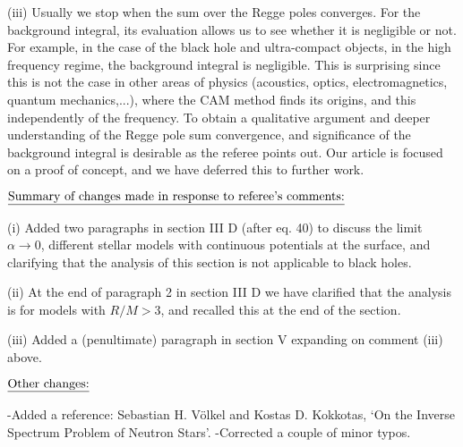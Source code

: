 


\bigskip
\bigskip
(iii)  Usually we stop when the sum over the Regge poles converges. For the background integral, its evaluation allows us to see whether it is negligible or not. For example, in the case of the black hole and ultra-compact objects, in the high frequency regime, the background integral is negligible. This is surprising since this is not the case in other areas of physics (acoustics, optics, electromagnetics, quantum mechanics,...), where the CAM method finds its origins, and this independently of the frequency. To obtain a qualitative argument and deeper understanding of the Regge pole sum convergence, and significance of the background integral is desirable as the referee points out. Our article is focused on a proof of concept, and we have deferred this to further work.  


\bigskip\bigskip


\noindent $\underline{\hbox{Summary of changes made in response to referee's comments:}}  $
\medskip

\smallskip
(i) Added two paragraphs in section III D (after eq. 40) to discuss the limit $\alpha \rightarrow0$, different stellar models with continuous potentials at the surface, and clarifying that the analysis of this section is not applicable to black holes. 

\bigskip
(ii)  At the end of paragraph 2 in section III D we have clarified that the analysis is for models with $R/M>3$, and recalled this at the end of the section. 

\bigskip
(iii) Added a (penultimate) paragraph in section V expanding on comment (iii) above. 






\bigskip\bigskip


\noindent $\underline{\hbox{Other changes:}}  $
\medskip

\smallskip
-Added a reference: Sebastian H. V{\"o}lkel and Kostas D. Kokkotas, `On the Inverse Spectrum Problem of Neutron Stars'.
\bigskip
-Corrected a couple of minor typos. 



\vfill \eject \bye






